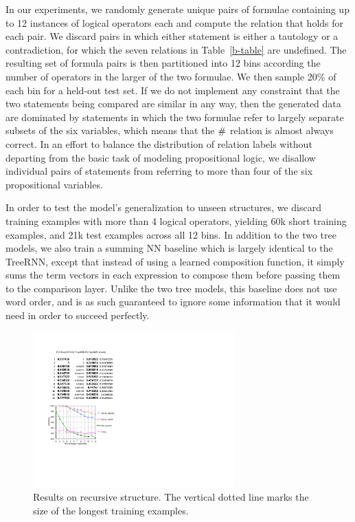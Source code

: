 In our experiments, we randomly generate unique pairs 
of formulae containing up to 12 instances of logical operators each and compute the relation that holds for each pair.
We discard pairs in which either statement is either a tautology or a
contradiction, for which the seven relations in
Table~\ref{b-table} are undefined. The resulting set of formula pairs is
then partitioned into 12 bins according the number of operators in
the larger of the two formulae. We then sample 20\% of each
bin for a held-out test set.
If we do not implement any constraint that the two statements being
compared are similar in any way, then the generated data are dominated
by statements in which the two formulae refer to largely separate
subsets of the six variables, which means that the $\mathbin{\#}$ relation
is almost always correct.  In an effort to balance the distribution of
relation labels without departing from the basic task of modeling
propositional logic, we disallow individual pairs of statements from
referring to more than four of the six propositional variables.

In order to test the model's generalization to unseen structures, we discard
training examples with more than 4 logical operators, yielding 60k short training examples,
and 21k test examples across all 12 bins.
In addition to the two tree models, we also train a summing NN baseline
which is largely identical to the TreeRNN, except that instead of using a learned composition function,
it simply sums the term vectors in each expression to compose them before passing them to the comparison layer. Unlike the two tree models, this baseline does not use word order,
and is as such guaranteed to ignore some information that it would need in order to succeed perfectly.

\begin{figure}[t]
  \centering
  \includegraphics[width=3.05in]{decayfig.pdf}
  \caption{Results on recursive structure. The vertical dotted line marks the size of the longest training examples.}
    
  \label{prop-results} 
\end{figure}



